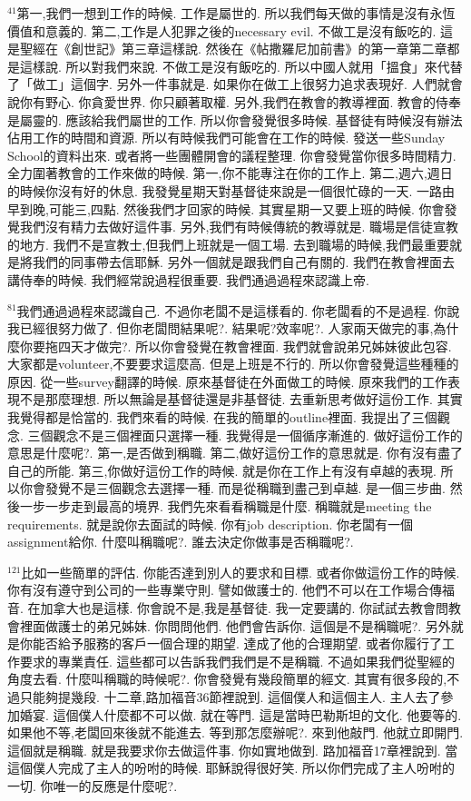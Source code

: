 \documentclass{book}
\begin{document}
$^{41}$第一,我們一想到工作的時候.
工作是屬世的.
所以我們每天做的事情是沒有永恆價值和意義的.
第二,工作是人犯罪之後的necessary evil.
不做工是沒有飯吃的.
這是聖經在《創世記》第三章這樣說.
然後在《帖撒羅尼加前書》的第一章第二章都是這樣說.
所以對我們來說.
不做工是沒有飯吃的.
所以中國人就用「搵食」來代替了「做工」這個字.
另外一件事就是.
如果你在做工上很努力追求表現好.
人們就會說你有野心.
你貪愛世界.
你只顧著取權.
另外,我們在教會的教導裡面.
教會的侍奉是屬靈的.
應該給我們屬世的工作.
所以你會發覺很多時候.
基督徒有時候沒有辦法佔用工作的時間和資源.
所以有時候我們可能會在工作的時候.
發送一些Sunday School的資料出來.
或者將一些團體開會的議程整理.
你會發覺當你很多時間精力.
全力圍著教會的工作來做的時候.
第一,你不能專注在你的工作上.
第二,週六,週日的時候你沒有好的休息.
我發覺星期天對基督徒來說是一個很忙碌的一天.
一路由早到晚,可能三,四點.
然後我們才回家的時候.
其實星期一又要上班的時候.
你會發覺我們沒有精力去做好這件事.
另外,我們有時候傳統的教導就是.
職場是信徒宣教的地方.
我們不是宣教士,但我們上班就是一個工場.
去到職場的時候,我們最重要就是將我們的同事帶去信耶穌.
另外一個就是跟我們自己有關的.
我們在教會裡面去講侍奉的時候.
我們經常說過程很重要.
我們通過過程來認識上帝.

$^{81}$我們通過過程來認識自己.
不過你老闆不是這樣看的.
你老闆看的不是過程.
你說我已經很努力做了.
但你老闆問結果呢?.
結果呢?效率呢?.
人家兩天做完的事,為什麼你要拖四天才做完?.
所以你會發覺在教會裡面.
我們就會說弟兄姊妹彼此包容.
大家都是volunteer,不要要求這麼高.
但是上班是不行的.
所以你會發覺這些種種的原因.
從一些survey翻譯的時候.
原來基督徒在外面做工的時候.
原來我們的工作表現不是那麼理想.
所以無論是基督徒還是非基督徒.
去重新思考做好這份工作.
其實我覺得都是恰當的.
我們來看的時候.
在我的簡單的outline裡面.
我提出了三個觀念.
三個觀念不是三個裡面只選擇一種.
我覺得是一個循序漸進的.
做好這份工作的意思是什麼呢?.
第一,是否做到稱職.
第二,做好這份工作的意思就是.
你有沒有盡了自己的所能.
第三,你做好這份工作的時候.
就是你在工作上有沒有卓越的表現.
所以你會發覺不是三個觀念去選擇一種.
而是從稱職到盡己到卓越.
是一個三步曲.
然後一步一步走到最高的境界.
我們先來看看稱職是什麼.
稱職就是meeting the requirements.
就是說你去面試的時候.
你有job description.
你老闆有一個assignment給你.
什麼叫稱職呢?.
誰去決定你做事是否稱職呢?.

$^{121}$比如一些簡單的評估.
你能否達到別人的要求和目標.
或者你做這份工作的時候.
你有沒有遵守到公司的一些專業守則.
譬如做護士的.
他們不可以在工作場合傳福音.
在加拿大也是這樣.
你會說不是,我是基督徒.
我一定要講的.
你試試去教會問教會裡面做護士的弟兄姊妹.
你問問他們.
他們會告訴你.
這個是不是稱職呢?.
另外就是你能否給予服務的客戶一個合理的期望.
達成了他的合理期望.
或者你履行了工作要求的專業責任.
這些都可以告訴我們我們是不是稱職.
不過如果我們從聖經的角度去看.
什麼叫稱職的時候呢?.
你會發覺有幾段簡單的經文.
其實有很多段的,不過只能夠提幾段.
十二章,路加福音36節裡說到.
這個僕人和這個主人.
主人去了參加婚宴.
這個僕人什麼都不可以做.
就在等門.
這是當時巴勒斯坦的文化.
他要等的.
如果他不等,老闆回來後就不能進去.
等到那怎麼辦呢?.
來到他敲門.
他就立即開門.
這個就是稱職.
就是我要求你去做這件事.
你如實地做到.
路加福音17章裡說到.
當這個僕人完成了主人的吩咐的時候.
耶穌說得很好笑.
所以你們完成了主人吩咐的一切.
你唯一的反應是什麼呢?.
\end{document}
